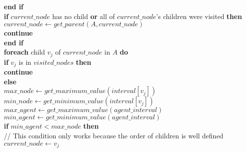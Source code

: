 \begin{algorithm}
\begin{algorithmic}
\hspace{0.3cm} \textbf{end if}\\

\hspace{0.3cm} \textbf{if} $current\_node$ has no child \textbf{or} all of $current\_node$'s children were visited \textbf{then}\\

\hspace{0.6cm} $current\_node \gets get\_parent(A, current\_node)$\\

\hspace{0.6cm} \textbf{continue}\\

\hspace{0.3cm} \textbf{end if}\\

\hspace{0.3cm} \textbf{foreach} child $v_{j}$ of $current\_node$ in $A$ \textbf{do}\\

\hspace{0.6cm} \textbf{if} $v_{j}$ is in $visited\_nodes$ \textbf{then}\\

\hspace{0.9cm} \textbf{continue} \\

\hspace{0.6cm} \textbf{else}\\

\hspace{0.9cm} $max\_node \gets get\_maximum\_value(interval[v_{j}])$\\

\hspace{0.9cm} $min\_node \gets get\_minimum\_value(interval[v_{j}])$\\

\hspace{0.9cm} $max\_agent \gets get\_maximum\_value(agent\_interval)$\\

\hspace{0.9cm} $min\_agent \gets get\_minimum\_value(agent\_interval)$\\

\hspace{0.9cm} \textbf{if} $min\_agent < max\_node$ \textbf{then}\\

\hspace{1.2cm} \slash\slash \hspace{0.1cm} This condition only works because the order of children is well defined\\
\hspace{1.2cm} $current\_node \gets v_{j}$\\


\end{algorithmic}
\end{algorithm}
